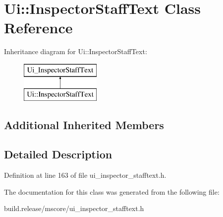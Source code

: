 \hypertarget{class_ui_1_1_inspector_staff_text}{}\section{Ui\+:\+:Inspector\+Staff\+Text Class Reference}
\label{class_ui_1_1_inspector_staff_text}
Inheritance diagram for Ui\+:\+:Inspector\+Staff\+Text\+:\begin{figure}[H]
\begin{center}
\leavevmode
\includegraphics[height=2.000000cm]{class_ui_1_1_inspector_staff_text}
\end{center}
\end{figure}
\subsection*{Additional Inherited Members}


\subsection{Detailed Description}


Definition at line 163 of file ui\+\_\+inspector\+\_\+stafftext.\+h.



The documentation for this class was generated from the following file\+:\begin{DoxyCompactItemize}
\item 
build.\+release/mscore/ui\+\_\+inspector\+\_\+stafftext.\+h\end{DoxyCompactItemize}

